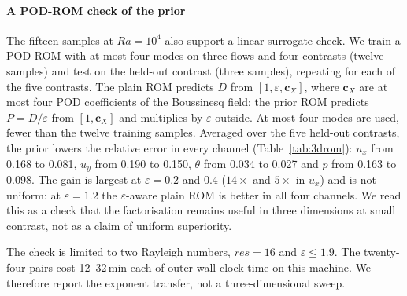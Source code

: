 \documentclass[preprint,11pt,a4paper,times,doubleblind]{elsarticle}
\begin{document}
\paragraph{A POD-ROM check of the prior} The fifteen samples at $Ra=10^4$ also support a
linear surrogate check. We train a POD-ROM with at most four modes on three flows and four
contrasts (twelve samples) and test on the held-out contrast (three samples),
repeating for each of the five contrasts. The plain ROM predicts $D$ from
$[1,\varepsilon,\bm c_X]$, where $\bm c_X$ are at most four POD coefficients of the
Boussinesq field; the prior ROM predicts $P=D/\varepsilon$ from
$[1,\bm c_X]$ and multiplies by $\varepsilon$ outside. At most four modes are used,
fewer than the twelve training samples. Averaged over the five held-out contrasts,
the prior lowers the relative error in every channel (Table~\ref{tab:3drom}):
$u_x$ from 0.168 to 0.081, $u_y$ from 0.190 to 0.150, $\theta$ from 0.034 to
0.027 and $p$ from 0.163 to 0.098. The gain is largest at $\varepsilon=0.2$ and
0.4 ($14\times$ and $5\times$ in $u_x$) and is not uniform: at $\varepsilon=1.2$ the
$\varepsilon$-aware plain ROM is better in all four channels. We read this as a
check that the factorisation remains useful in three dimensions at small
contrast, not as a claim of uniform superiority.


The check is limited to two Rayleigh numbers, $res=16$ and $\varepsilon\le1.9$. The twenty-four
pairs cost 12--32\,min each of outer wall-clock time on this machine. We therefore report the
exponent transfer, not a three-dimensional sweep.
\end{document}
